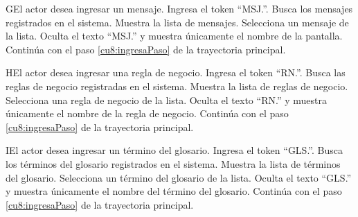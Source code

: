  \begin{UCtrayectoriaA}{G}{El actor desea ingresar un mensaje.}
 	 \UCpaso[\UCactor] Ingresa el token ``MSJ.''.	
 	\UCpaso[\UCsist] Busca los mensajes registrados en el sistema. 
 	\UCpaso[\UCsist] Muestra la lista de mensajes.
 	\UCpaso[\UCactor] Selecciona un mensaje de la lista.
  	\UCpaso[\UCsist] Oculta el texto ``MSJ.'' y muestra únicamente el nombre de la pantalla.
    \UCpaso[] Continúa con el paso \ref{cu8:ingresaPaso} de la trayectoria principal.
 \end{UCtrayectoriaA}

 \begin{UCtrayectoriaA}{H}{El actor desea ingresar una regla de negocio.}
 	\UCpaso[\UCactor] Ingresa el token ``RN.''.	
 	\UCpaso[\UCsist] Busca las reglas de negocio registradas en el sistema. 
 	\UCpaso[\UCsist] Muestra la lista de reglas de negocio.
 	\UCpaso[\UCactor] Selecciona una regla de negocio de la lista.
  	\UCpaso[\UCsist] Oculta el texto ``RN.'' y muestra únicamente el nombre de la regla de negocio.
    \UCpaso[] Continúa con el paso \ref{cu8:ingresaPaso} de la trayectoria principal.
 \end{UCtrayectoriaA}

 \begin{UCtrayectoriaA}{I}{El actor desea ingresar un término del glosario.}
 	\UCpaso[\UCactor] Ingresa el token ``GLS.''.	
 	\UCpaso[\UCsist] Busca los términos del glosario registrados en el sistema. 
 	\UCpaso[\UCsist] Muestra la lista de términos del glosario.
 	\UCpaso[\UCactor] Selecciona un término del glosario de la lista.
  	\UCpaso[\UCsist] Oculta el texto ``GLS.'' y muestra únicamente el nombre del término del glosario.
    \UCpaso[] Continúa con el paso \ref{cu8:ingresaPaso} de la trayectoria principal.
 \end{UCtrayectoriaA}

